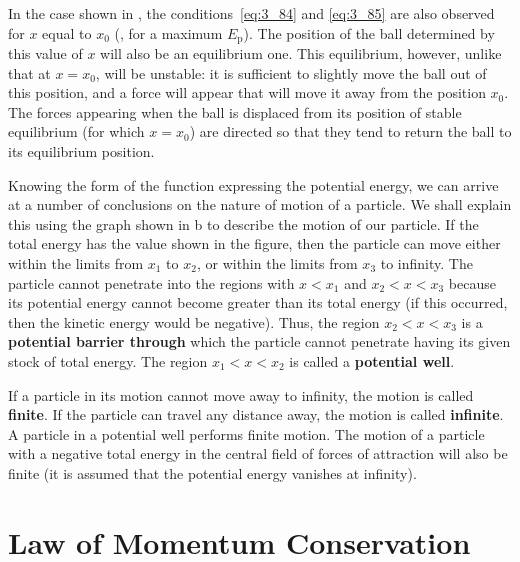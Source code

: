 \begin{figure}[t]
\begin{minipage}[t]{0.5\linewidth}
\begin{center}
			\caption[]{}
			\label{fig:3_15}
		\end{center}
	\end{minipage}
	\vspace{-0.5cm}
\end{figure}

In the case shown in , the conditions~\eqref{eq:3_84} and \eqref{eq:3_85} are also observed for $x$ equal to $x_0$ (\ie, for a maximum $E_{\text{p}}$). The position of the ball determined by this value of $x$ will also be an equilibrium one. This equilibrium, however, unlike that at $x=x_0$, will be unstable: it is sufficient to slightly move the ball out of this position, and a force will appear that will move it away from the position $x_0$. The forces appearing when the ball is displaced from its position of stable equilibrium (for which $x=x_0$) are directed so that they tend to return the ball to its equilibrium position.

Knowing the form of the function expressing the potential energy, we can arrive at a number of conclusions on the nature of motion of a particle. We shall explain this using the graph shown in b to describe the motion of our particle. If the total energy has the value shown in the figure, then the particle can move either within the limits from $x_1$ to $x_2$, or within the limits from $x_3$ to infinity. The particle cannot penetrate into the regions with $x<x_1$ and $x_2<x<x_3$ because its potential energy cannot become greater than its total energy (if this occurred, then the kinetic energy would be negative). Thus, the region $x_2<x<x_3$ is a \textbf{potential barrier through} which the particle cannot penetrate having its given stock of total energy. The region $x_1<x<x_2$ is called a \textbf{potential well}.

If a particle in its motion cannot move away to infinity, the motion is called \textbf{finite}. If the particle can travel any distance away, the motion is called \textbf{infinite}. A particle in a potential well performs finite motion. The motion of a particle with a negative total energy in the central field of forces of attraction will also be finite (it is assumed that the potential energy vanishes at infinity).

\section{Law of Momentum Conservation}\label{sec:3_10}

